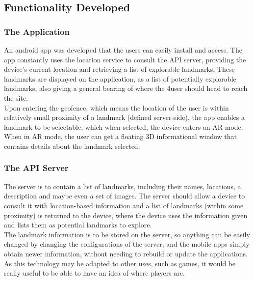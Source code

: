 \subsection{Functionality Developed}
\subsubsection{The Application}
An android app was developed that the users can easily install and access. The app constantly uses the location service to consult the API server, providing the device's current
 location and retrieving a list of explorable landmarks. These landmarks are displayed on the application, as a list of potentially explorable landmarks,
 also giving a general bearing of where the 4user should head to reach the site.\\
 Upon entering the geofence, which means the location of the user is within relatively small proximity of a landmark (defined server-side), the app enables a landmark to be selectable, which when selected, the device enters an AR mode.\\
 When in AR mode, the user can get a floating 3D informational window that contains details about the landmark selected.
 \subsubsection{The API Server}
 The server is to contain a list of landmarks, including their names, locations, a description and maybe even a set of images. The server should allow a device to consult it with
 location-based information and a list of landmarks (within some proximity) is returned to the device, where the device uses the information given and lists them as potential landmarks to explore.\\
 The landmark information is to be stored on the server, so anything can be easily changed by changing the configurations of the server, and the mobile apps simply obtain newer information, 
 without needing to rebuild or update the applications. As this technology may be adapted to other uses, such as games, it would be really useful to be able to have an idea of where 
 players are.